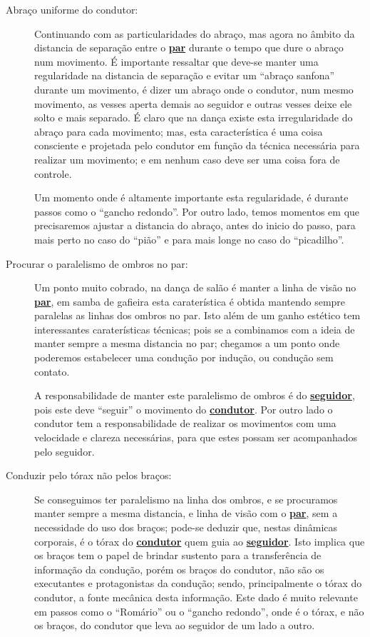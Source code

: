 \begin{description}
\item[Abraço uniforme do condutor:] Continuando com as particularidades do abraço,
mas agora no âmbito da distancia de separação entre o \hyperref[def:Par]{\textbf{par}} durante o tempo que dure o abraço num movimento.
É importante ressaltar que deve-se manter uma regularidade na distancia de separação
e evitar um ``abraço sanfona'' durante um movimento, é dizer um abraço onde o condutor, num mesmo movimento, as vesses 
aperta demais ao seguidor e outras vesses deixe ele solto e mais separado.
É claro que na dança existe esta irregularidade do abraço para cada movimento; 
mas, esta característica é uma coisa consciente e projetada 
pelo condutor em função da técnica necessária para realizar um movimento; 
e em nenhum caso deve ser uma coisa fora de controle.

Um momento onde é altamente importante esta regularidade, 
é durante passos como o ``gancho redondo''.
Por outro lado, temos momentos em que precisaremos ajustar a distancia do abraço,
antes do inicio do passo, para mais perto no caso do ``pião'' e para mais longe no caso do ``picadilho''.

\item[Procurar o paralelismo de ombros no par:] 
Um ponto muito cobrado, na dança de salão é manter a linha de visão no \hyperref[def:Par]{\textbf{par}},
em samba de gafieira esta caraterística é obtida mantendo sempre paralelas as linhas dos ombros no par.
Isto além de um ganho estético tem interessantes caraterísticas técnicas;
pois se a combinamos com a ideia de manter sempre a mesma distancia no par;
chegamos a um ponto onde poderemos estabelecer uma condução por indução, ou condução sem contato.

A responsabilidade de manter este paralelismo de ombros é do \hyperref[def:Seguidor]{\textbf{seguidor}},
pois este deve ``seguir'' o movimento do \hyperref[def:Condutor]{\textbf{condutor}}.
Por outro lado o condutor tem a responsabilidade de realizar os movimentos com uma velocidade e clareza necessárias, 
para que estes possam ser acompanhados pelo seguidor.

\item[Conduzir pelo tórax não pelos braços:] 
Se conseguimos ter paralelismo na linha dos ombros,
e se procuramos manter sempre a mesma distancia, 
e linha de visão com o \hyperref[def:Par]{\textbf{par}}, 
sem a necessidade do uso dos braços;
pode-se deduzir que, nestas dinâmicas corporais,
é o tórax do \hyperref[def:Condutor]{\textbf{condutor}} quem guia ao \hyperref[def:Seguidor]{\textbf{seguidor}}.
Isto implica que os braços tem o papel de brindar sustento para a transferência de informação da condução,
porém os braços do condutor, não são os executantes e protagonistas da condução;
sendo, principalmente o tórax do condutor, a fonte mecânica desta informação.
Este dado é muito relevante em passos como o ``Romário'' ou o ``gancho redondo'',
onde é o tórax, e não os braços, do condutor que leva ao seguidor de um lado a outro. 


\end{description}
